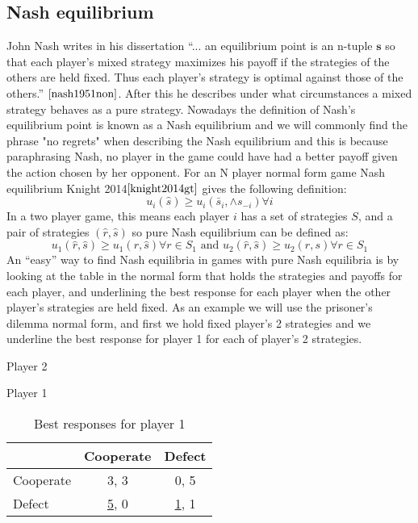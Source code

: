 \subsection{Nash equilibrium}\label{third_section}
John Nash writes in his dissertation ``... an equilibrium point is an n-tuple $\textbf{s}$ so that each player's mixed strategy maximizes his payoff if the strategies of the others are held fixed. Thus each player's strategy is optimal against those of the others.'' $\cite{nash1951non}$.  After this he describes under what circumstances a mixed strategy behaves as a pure strategy. Nowadays the definition of Nash's equilibrium point is known as a Nash equilibrium and we will commonly find the phrase "no regrets" when describing the Nash equilibrium and this is because paraphrasing Nash, no player in the game could have had a better payoff given the action chosen by her opponent. For an N player normal form game Nash equilibrium Knight 2014$\cite{knight2014gt}$ gives the following definition:
\begin{equation}
u_i(\hat{s}) \geq u_i(\bar{s}_i, \wedge{s}_{-i}) \forall i
\end{equation}
 In a two player game, this means each player $\textit{i}$ has a set of strategies $\textit{S}$, and a pair of strategies $(\hat{r}, \hat{s})$ so pure Nash equilibrium can be defined as:
\begin{equation}
u_1(\hat{r}, \hat{s}) \geq u_1(r, \hat{s}) \forall r \in S_1   \text{ and }  u_2(\hat{r}, \hat{s}) \geq u_2(\hat{r}, s) \forall r \in S_1
\end{equation}
An ``easy'' way to find Nash equilibria in games with pure Nash equilibria is by looking at the table in the normal form that holds the strategies and payoffs for each player, and underlining the best response for each player when the other player's strategies are held fixed.
As an example we will use the prisoner's dilemma normal form, and first we hold fixed player's 2 strategies and we underline the best response for player 1 for each of player's 2 strategies.

\begin{table}[h]
\begin{center}
Player 2

Player 1
\begin{tabular}{|l|c|c|}
\hline
 & Cooperate & Defect\\ 
\hline
Cooperate & 3, 3 & 0, 5\\
\hline
Defect & \underline{5}, 0 & \underline{1}, 1\\
\hline
\end{tabular}
\caption{Best responses for player 1}
\label{tab:normformbr1}
\end{center}
\end{table}

